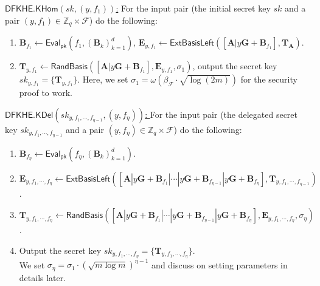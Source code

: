 \documentclass[runningheads,10pt]{llncs}
\begin{document}
\begin{description}
	
	
	\item \underline{$\textsf{DFKHE.KHom}(sk, (y,f_1) )$:} 
	For the input pair (the initial secret key  $sk$ and a pair $(y, f_1) \in \mathbb{Z}_q \times \mathcal{F}$) do the following:
	\begin{enumerate}
	\item $\textbf{B}_{f_1} \leftarrow \textsf{Eval}_\textsf{pk}(f_1, (\textbf{B}_k)_{k=1}^d)$,  $\textbf{E}_{y,f_1} \leftarrow \textsf{ExtBasisLeft}([\textbf{A}|y\mathbf{G}+\textbf{B}_{f_1}], \textbf{T}_\textbf{A})$. %
	\item   $\textbf{T}_{y,f_1} \leftarrow \textsf{RandBasis}([\textbf{A}|y\mathbf{G}+\textbf{B}_{f_1}],\textbf{E}_{y,f_1}, \sigma_1)$, output the secret key  $sk_{y,f_1}=\{\textbf{T}_{y,f_1}\}$.
Here, we set $\sigma_1=\omega(\beta_\mathcal{F}\cdot \sqrt{\log (2m)})$  for the security proof to work. 
	\end{enumerate}
	
		
		\item \underline{$\textsf{DFKHE.KDel}(sk_{y,f_1,\cdots, f_{\eta-1}}, (y, f_{\eta}) )$: }
	For the input pair (the delegated secret key  $sk_{y,f_1,\cdots, f_{\eta-1}} $ and a pair $(y, f_\eta) \in \mathbb{Z}_q \times \mathcal{F}$) do the following:
	\begin{enumerate}
	\item $\textbf{B}_{f_\eta} \leftarrow \textsf{Eval}_\textsf{pk}(f_\eta, (\textbf{B}_k)_{k=1}^d)$.
	\item   $\textbf{E}_{y,f_1,\cdots, f_{\eta}} \leftarrow \textsf{ExtBasisLeft}([\textbf{A}|y\mathbf{G}+\textbf{B}_{f_1}|\cdots|y\mathbf{G}+\textbf{B}_{f_{\eta-1}}|y\mathbf{G}+\textbf{B}_{f_\eta}], \textbf{T}_{y,f_1,\cdots, f_{\eta-1}})$.
	\item  $\textbf{T}_{y,f_1,\cdots, f_{\eta}} \leftarrow \textsf{RandBasis}([\textbf{A}|y\mathbf{G}+\textbf{B}_{f_1}|\cdots|y\mathbf{G}+\textbf{B}_{f_{\eta-1}}|y\mathbf{G}+\textbf{B}_{f_\eta}], \textbf{E}_{y,f_1,\cdots, f_{\eta}}, \sigma_\eta)$.
	\item Output the secret key $sk_{y,f_1,\cdots, f_{\eta}}=\{\textbf{T}_{y,f_1,\cdots, f_{\eta}}\}$.\\
	 We set $\sigma_\eta=\sigma_1\cdot(\sqrt{m\log m})^{\eta-1}$ and discuss on setting parameters in details later.
	\end{enumerate}
	


\end{description}
\end{document}
